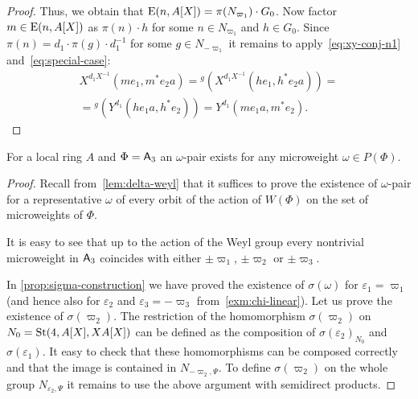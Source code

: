 \begin{proof}
    Thus, we obtain that $\operatorname{E}(n, A[X]) = \pi(N_{\varpi_1}) \cdot G_0$.
    Now factor $m \in \operatorname{E}(n, A[X])$ as $\pi(n) \cdot h$ for some $n\in N_{\varpi_1}$ and $h \in G_0$.
    Since $\pi(n) = d_1 \cdot \pi(g) \cdot d_1^{-1}$ for some $g \in N_{-\varpi_1}$ it remains to apply~\eqref{eq:xy-conj-n1} and~\eqref{eq:special-case}:
    \begin{multline}
        \nonumber X^{d_1 X^{-1}}(me_1, m^*e_{2}a) = {}^{g}(X^{d_1 X^{-1}}(he_1, h^*e_{2}a)) = \\
        = {}^{g}(Y^{d_1}(he_{1}a, h^*e_2)) = Y^{d_1}(me_{1}a, m^{*} e_{2}).
    \end{multline}
\end{proof}

\begin{cor} \label{cor:a3-microweight}
    For a local ring $A$ and $\Phi = \mathsf{A}_3$ an $\omega$-pair exists for any microweight $\omega \in P(\Phi)$.
\end{cor}
\begin{proof}
    Recall from~\cref{lem:delta-weyl} that it suffices to prove the existence of $\omega$-pair for a representative $\omega$
     of every orbit of the action of $W(\Phi)$ on the set of microweights of $\Phi$.

    It is easy to see that up to the action of the Weyl group every nontrivial microweight in $\mathsf{A}_3$ coincides with either
    $\pm\varpi_1$, $\pm\varpi_2$ or $\pm\varpi_3$.

    In \cref{prop:sigma-construction} we have proved the existence of $\sigma(\omega)$ for $\varepsilon_1 = \varpi_1$ (and hence also for $\varepsilon_2$ and $\varepsilon_3 = -\varpi_3$ from~\cref{exm:chi-linear}).
    Let us prove the existence of $\sigma(\varpi_2)$.
    The restriction of the homomorphism $\sigma(\varpi_2)$ on $N_0 = \operatorname{St}(4, A[X], XA[X])$ can be defined as the composition of
     $\sigma(\varepsilon_2)_{N_0}$ and $\sigma(\varepsilon_1)$.
    It easy to check that these homomorphisms can be composed correctly and that the image is contained in $N_{-\varpi_2, \Psi}$.
    To define $\sigma(\varpi_2)$ on the whole group $N_{\varepsilon_2, \Psi}$ it remains to use the above argument with semidirect products.
\end{proof}

